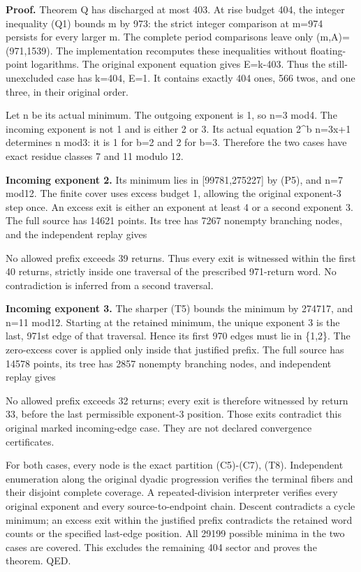 \textbf{Proof.} Theorem Q has discharged at most 403. At rise budget
404, the integer inequality (Q1) bounds m by 973: the strict integer
comparison at m=974 persists for every larger m. The complete period
comparisons leave only (m,A)=(971,1539). The implementation recomputes
these inequalities without floating-point logarithms. The original
exponent equation gives E=k-403. Thus the still-unexcluded case has
k=404, E=1. It contains exactly 404 ones, 566 twos, and one three, in
their original order.

Let n be its actual minimum. The outgoing exponent is 1, so n=3 mod4.
The incoming exponent is not 1 and is either 2 or 3. Its actual equation
2\^{}b n=3x+1 determines n mod3: it is 1 for b=2 and 2 for b=3.
Therefore the two cases have exact residue classes 7 and 11 modulo 12.

\textbf{Incoming exponent 2.} Its minimum lies in {[}99781,275227{]} by
(P5), and n=7 mod12. The finite cover uses excess budget 1, allowing the
original exponent-3 step once. An excess exit is either an exponent at
least 4 or a second exponent 3. The full source has 14621 points. Its
tree has 7267 nonempty branching nodes, and the independent replay gives


No allowed prefix exceeds 39 returns. Thus every exit is witnessed
within the first 40 returns, strictly inside one traversal of the
prescribed 971-return word. No contradiction is inferred from a second
traversal.

\textbf{Incoming exponent 3.} The sharper (T5) bounds the minimum by
274717, and n=11 mod12. Starting at the retained minimum, the unique
exponent 3 is the last, 971st edge of that traversal. Hence its first
970 edges must lie in \{1,2\}. The zero-excess cover is applied only
inside that justified prefix. The full source has 14578 points, its tree
has 2857 nonempty branching nodes, and independent replay gives


No allowed prefix exceeds 32 returns; every exit is therefore witnessed
by return 33, before the last permissible exponent-3 position. Those
exits contradict this original marked incoming-edge case. They are not
declared convergence certificates.

For both cases, every node is the exact partition (C5)-(C7), (T8).
Independent enumeration along the original dyadic progression verifies
the terminal fibers and their disjoint complete coverage. A
repeated-division interpreter verifies every original exponent and every
source-to-endpoint chain. Descent contradicts a cycle minimum; an excess
exit within the justified prefix contradicts the retained word counts or
the specified last-edge position. All 29199 possible minima in the two
cases are covered. This excludes the remaining 404 sector and proves the
theorem. QED.

